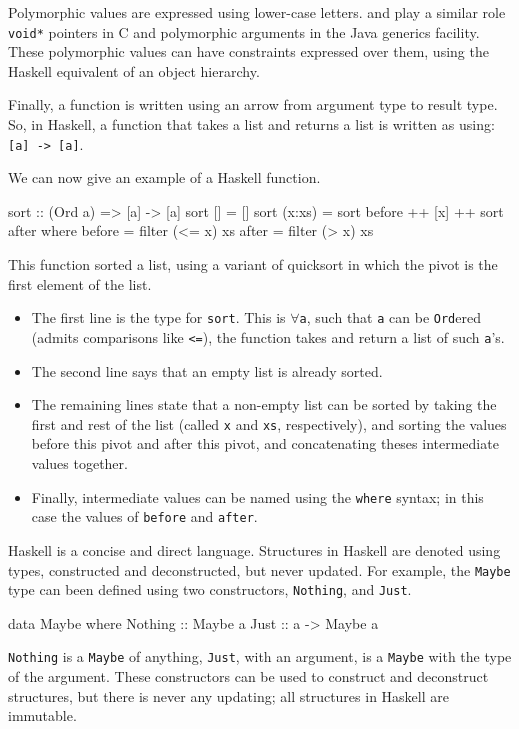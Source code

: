 \documentclass[11pt]{article}
\begin{document}
Polymorphic values are expressed using lower-case letters.
and play a similar role 
\verb|void*| pointers in C
and polymorphic arguments in the Java generics facility.
These polymorphic values can have constraints expressed over them,
using the Haskell equivalent of an object hierarchy.

Finally, a function is written using an arrow from 
argument type to result type.
So, in Haskell, a function that takes a list and returns a list
is written as using: \verb|[a] -> [a]|.

We can now give an example of a Haskell function.%
\begin{Code}

sort :: (Ord a) => [a] -> [a]
sort []     = []
sort (x:xs) = sort before ++ [x] ++ sort after
  where
        before = filter (<= x) xs
        after  = filter (> x) xs

\end{Code}
This function sorted a list, using a variant of quicksort in which the pivot is
the first element of the list.
\begin{itemize}
\item The first line is the type for \verb|sort|. This is $\forall$\verb|a|, such that
\verb|a| can be \verb|Ord|ered (admits comparisons like \verb|<=|), the function
takes and return a list of such \verb|a|'s.
\item The second line says that an empty list is already sorted.
\item The remaining lines state that a non-empty list can be
sorted by taking the first and rest of the list (called \verb|x| and \verb|xs|, respectively),
and sorting the values before this pivot and after this pivot,
and concatenating theses intermediate values together.
\item Finally, intermediate values can be named using the \verb|where| syntax;
in this case the values of \verb|before| and \verb|after|.
\end{itemize}

Haskell is a concise and direct language.
Structures in Haskell are denoted using types, constructed
and deconstructed, but never updated. For example, the \verb|Maybe| type
can been defined using two constructors, \verb|Nothing|, and \verb|Just|.
\begin{Code}
        
data Maybe where
  Nothing ::      Maybe a
  Just    :: a -> Maybe a

\end{Code}
\verb|Nothing| is a \verb|Maybe| of anything, \verb|Just|, with an argument,
is a \verb|Maybe| with the type of the argument. These constructors can be
used to construct and deconstruct structures, but there is never any updating;
all structures in Haskell are immutable.
\end{document}
